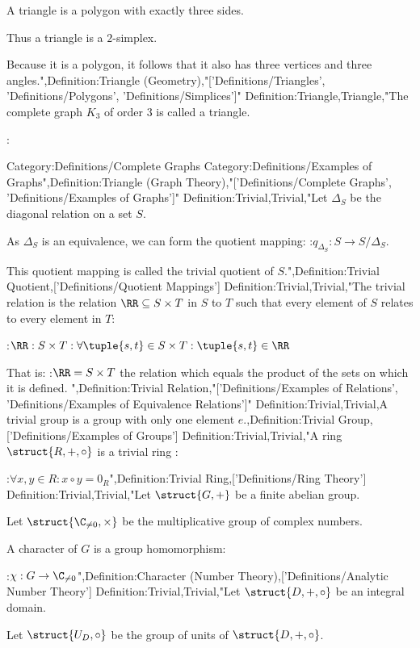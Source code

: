 A triangle is a polygon with exactly three sides.


Thus a triangle is a $2$-simplex.


Because it is a polygon, it follows that it also has three vertices and three angles.",Definition:Triangle (Geometry),"['Definitions/Triangles', 'Definitions/Polygons', 'Definitions/Simplices']"
Definition:Triangle,Triangle,"The complete graph $K_3$ of order $3$ is called a triangle.

:

Category:Definitions/Complete Graphs
Category:Definitions/Examples of Graphs",Definition:Triangle (Graph Theory),"['Definitions/Complete Graphs', 'Definitions/Examples of Graphs']"
Definition:Trivial,Trivial,"Let $\Delta_S$ be the diagonal relation on a set $S$.

As $\Delta_S$ is an equivalence, we can form the quotient mapping:
:$q_{\Delta_S}: S \to S / \Delta_S$.


This quotient mapping is called the trivial quotient of $S$.",Definition:Trivial Quotient,['Definitions/Quotient Mappings']
Definition:Trivial,Trivial,"The trivial relation is the relation $\RR \subseteq S \times T$ in $S$ to $T$ such that every element of $S$ relates to every element in $T$:

:$\RR: S \times T: \forall \tuple {s, t} \in S \times T: \tuple {s, t} \in \RR$


That is:
:$\RR = S \times T$
the relation which equals the product of the sets on which it is defined.
",Definition:Trivial Relation,"['Definitions/Examples of Relations', 'Definitions/Examples of Equivalence Relations']"
Definition:Trivial,Trivial,A trivial group is a group with only one element $e$.,Definition:Trivial Group,['Definitions/Examples of Groups']
Definition:Trivial,Trivial,"A ring $\struct {R, +, \circ}$ is a trivial ring :

:$\forall x, y \in R: x \circ y = 0_R$",Definition:Trivial Ring,['Definitions/Ring Theory']
Definition:Trivial,Trivial,"Let $\struct {G, +}$ be a finite abelian group.

Let $\struct {\C_{\ne 0}, \times}$ be the multiplicative group of complex numbers.


A character of $G$ is a group homomorphism:

:$\chi: G \to \C_{\ne 0}$",Definition:Character (Number Theory),['Definitions/Analytic Number Theory']
Definition:Trivial,Trivial,"Let $\struct {D, +, \circ}$ be an integral domain.

Let $\struct {U_D, \circ}$ be the group of units of $\struct {D, +, \circ}$.



